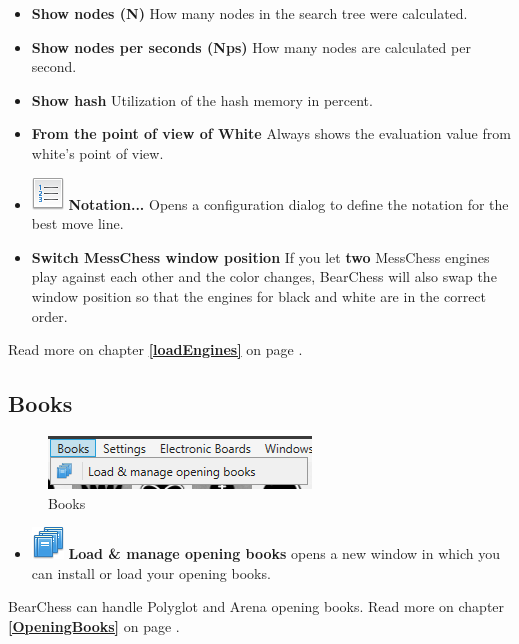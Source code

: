 \documentclass[11pt,a4paper]{article}
\begin{document}
\begin{itemize}
	\item  \textbf{Show nodes (N)} How many nodes in the search tree were calculated.
	\item \textbf{Show nodes per seconds (Nps)} How many nodes are calculated per second.
	\item \textbf{Show hash} Utilization of the hash memory in percent.
	\item \textbf{From the point of view of White} Always shows the evaluation value from white's point of view.
	\item  \includegraphics[scale=0.5]{text_list_numbers.png} \textbf{Notation...} Opens a configuration dialog to define the notation for the best move line.
	\item \textbf{Switch MessChess window position} If you let \textbf{two} MessChess engines play against each other and the color changes, BearChess will also swap the window position so that the engines for black and white are in the correct order.
\end{itemize}

Read more on chapter \textbf{\ref{loadEngines}  } on page \pageref{loadEngines}.

\subsection{Books}
\begin{figure}[H]
	\centering
	\includegraphics[scale=1.0]{Books.png}
	\caption{Books}
	\label{fig:Books}
\end{figure}
\begin{itemize}
	\item \includegraphics[scale=0.5]{books_stack.png} \textbf{Load \& manage opening books} opens a new window in which you can install or load  your opening books.
\end{itemize}
BearChess can handle Polyglot and Arena opening books. Read more on chapter \textbf{\ref{OpeningBooks}  } on page \pageref{OpeningBooks}.
\end{document}
